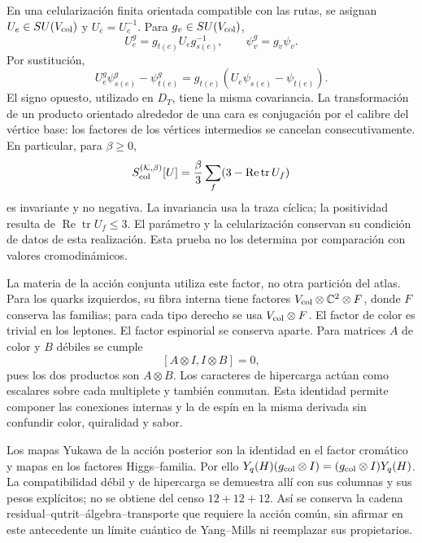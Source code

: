 En una celularización finita orientada compatible con las rutas,
se asignan \(U_e\in SU(V_{\rm col})\) y
\(U_{\bar e}=U_e^{-1}\). Para \(g_v\in SU(V_{\rm col})\),
\[
 U_e^g=g_{t(e)}U_eg_{s(e)}^{-1},\qquad
 \psi_v^g=g_v\psi_v.
\]
Por sustitución,
\[
 U_e^g\psi_{s(e)}^g-\psi_{t(e)}^g
 =g_{t(e)}(U_e\psi_{s(e)}-\psi_{t(e)}).
\]
El signo opuesto, utilizado en \(D_T\), tiene la misma covariancia.
La transformación de un producto orientado alrededor de una cara
es conjugación por el calibre del vértice base: los factores de
los vértices intermedios se cancelan consecutivamente. En particular,
para \(\beta\ge0\),
\[
 S_{\rm col}^{(\mathcal K,\beta)}[U]
 =\frac\beta3\sum_f(3-\operatorname{Re}\operatorname{tr}U_f)
\]
es invariante y no negativa. La invariancia usa la traza cíclica;
la positividad resulta de \(\operatorname{Re}\operatorname{tr}U_f\le3\).
El parámetro y la celularización conservan su condición de datos de
esta realización. Esta prueba no los determina por comparación con
valores cromodinámicos.

La materia de la acción conjunta utiliza este factor, no otra
partición del atlas. Para los quarks izquierdos, su fibra interna
tiene factores \(V_{\rm col}\otimes\mathbb C^2\otimes F\),
donde \(F\) conserva las familias; para cada tipo derecho se usa
\(V_{\rm col}\otimes F\). El factor de color es trivial en los
leptones. El factor espinorial se conserva aparte. Para matrices
\(A\) de color y \(B\) débiles se cumple
\[
 [A\otimes I,I\otimes B]=0,
\]
pues los dos productos son \(A\otimes B\). Los caracteres de
hipercarga actúan como escalares sobre cada multiplete y también
conmutan. Esta identidad permite componer las conexiones internas
y la de espín en la misma derivada sin confundir color, quiralidad
y sabor.

Los mapas Yukawa de la acción posterior son la identidad en el
factor cromático y mapas en los factores Higgs--familia. Por ello
\(Y_q(H)(g_{\rm col}\otimes I)
=(g_{\rm col}\otimes I)Y_q(H)\). La compatibilidad débil y de
hipercarga se demuestra allí con sus columnas y sus pesos explícitos;
no se obtiene del censo \(12+12+12\).
Así se conserva la cadena residual--qutrit--álgebra--transporte
que requiere la acción común, sin afirmar en este antecedente un
límite cuántico de Yang--Mills ni reemplazar sus propietarios.

